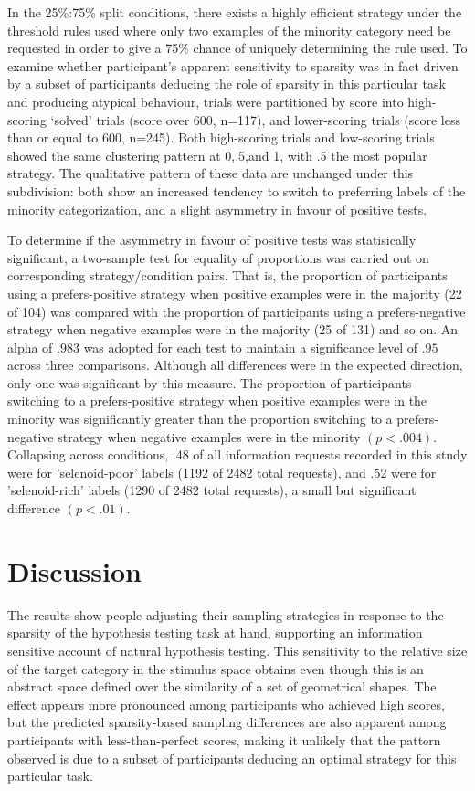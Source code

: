 \documentclass[10pt,letterpaper]{article}
\begin{document}
In the 25\%:75\% split conditions, there exists a highly efficient strategy under the threshold rules used where only two examples of the minority category need be requested in order to give a 75\% chance of uniquely determining the rule used. To examine whether participant's apparent sensitivity to sparsity was in fact driven by a subset of participants deducing the role of sparsity in this particular task and producing atypical behaviour, trials were partitioned by score into high-scoring `solved' trials (score over 600, n=117), and lower-scoring trials (score less than or equal to 600, n=245). Both high-scoring trials and low-scoring trials showed the same clustering pattern at 0,.5,and 1, with .5 the most popular strategy. The qualitative pattern of these data are unchanged under this subdivision: both show an increased tendency to switch to preferring labels of the minority categorization, and a slight asymmetry in favour of positive tests.

To determine if the asymmetry in favour of positive tests was statisically significant, a two-sample test for equality of proportions was carried out on corresponding strategy/condition pairs. That is, the proportion of participants using a prefers-positive strategy when positive examples were in the majority (22 of 104) was compared with the proportion of participants using a prefers-negative strategy when negative examples were in the majority (25 of 131) and so on. An alpha of $.983$ was adopted for each test to maintain a significance level of $.95$ across three comparisons. Although all differences were in the expected direction, only one was significant by this measure. The proportion of participants switching to a prefers-positive strategy when positive examples were in the minority was significantly greater than the proportion switching to a prefers-negative strategy when negative examples were in the minority $(p<.004)$. Collapsing across conditions, .48 of all information requests recorded in this study were for 'selenoid-poor' labels (1192 of 2482 total requests), and .52 were for 'selenoid-rich' labels (1290 of 2482 total requests), a small but significant difference $(p<.01)$.

\section{Discussion}
The results show people adjusting their sampling strategies in response to the sparsity of the hypothesis testing task at hand, supporting an information sensitive account of natural hypothesis testing\cite{navarro2011sparsecat}. This sensitivity to the relative size of the target category in the stimulus space obtains even though this is an abstract space defined over the similarity of a set of geometrical shapes. The effect appears more pronounced among participants who achieved high scores, but the predicted sparsity-based sampling differences are also apparent among participants with less-than-perfect scores, making it unlikely that the pattern observed is due to a subset of participants deducing an optimal strategy for this particular task. %
\end{document}
